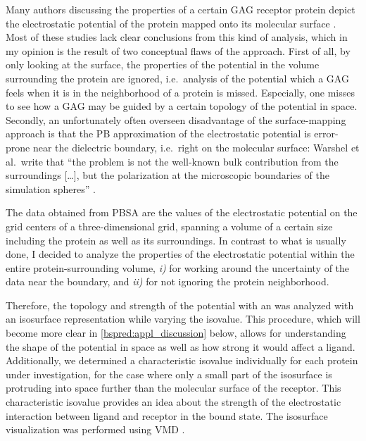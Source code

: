 Many authors discussing the properties of a certain GAG receptor protein depict
the electrostatic potential of the protein mapped onto its molecular surface
\cite{rogers_gag_prot_prot_2011,%
Gandhi01102009,sapay_hs_growthfactors_2011,%
gandhi_bmp_heparin_binding_sites_2012,sost_heparin_2009,%
catK_cs4_crystal_structure_2008,hydrolase_gags_2011,gandhi_structure_2008,%
imberty_gag_prot_carbres_2007,gags_as_polyelectrolytes_2010}. Most of these
studies lack clear conclusions from this kind of analysis, which in my opinion
is the result of two conceptual flaws of the approach. First of all, by only
looking at the surface, the properties of the potential in the volume
surrounding the protein are ignored, i.e.\ analysis of the potential which a GAG
feels when it is in the neighborhood of a protein is missed. Especially, one
misses to see how a GAG may be guided by a certain topology of the potential in
space. Secondly, an unfortunately often overseen disadvantage of the
surface-mapping approach is that the PB approximation of the electrostatic
potential is  error-prone near the dielectric boundary, i.e.\ right
on the molecular surface: Warshel et al.\ write that \enquote{the problem is not
the well-known bulk contribution from the surroundings [\dots], but the
polarization at the microscopic boundaries of the simulation spheres}
\cite{estatic_proteins_warshel_2006}.

The data obtained from PBSA are the values of the electrostatic potential on the
grid centers of a three-dimensional grid, spanning a volume of a certain size
including the protein as well as its surroundings. In contrast to what is
usually done, I decided to analyze the properties of the electrostatic potential
within the entire protein-surrounding volume, \textit{i)} for working around the
uncertainty of the data near the boundary, and \textit{ii)} for not ignoring the
protein neighborhood.

Therefore, the topology and strength of the potential with an was analyzed with
an isosurface representation while varying the isovalue. This procedure, which
will become more clear in \cref{bspred:appl_discussion} below, allows for
understanding the shape of the potential in space as well as how strong it would
affect a ligand. Additionally, we determined a characteristic isovalue
individually for each protein under investigation, for the case where only a
small part of the isosurface is protruding into space further than the molecular
surface of the receptor. This characteristic isovalue provides an idea about the
strength of the electrostatic interaction between ligand and receptor in the
bound state. The isosurface visualization was performed using VMD
\cite{vmd_1996}.


